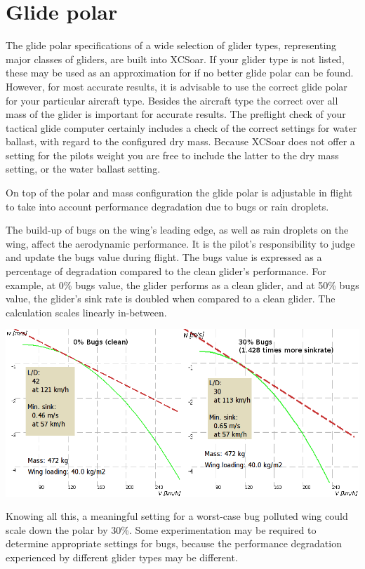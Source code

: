 \section{Glide polar}

The glide polar specifications of a wide selection of glider types,
representing major classes of gliders, are built into XCSoar.
If your glider type is not listed, these may be used as an approximation for  
if no better glide polar can be found.   However, for most 
accurate results, it is advisable to use the correct glide polar for your particular
aircraft type. 
Besides the aircraft type the correct over all mass of the glider is important for 
accurate results. 
The preflight check of your tactical glide computer certainly 
includes a check of the correct settings for water ballast, with regard to the 
configured dry mass. Because XCSoar does not offer a setting for the pilots 
weight you are free to include the latter to the dry mass setting, or the 
water ballast setting.

On top of the polar and mass configuration the glide polar is adjustable 
in flight to take into account performance degradation due to bugs or 
rain droplets.

The build-up of bugs on the wing's leading edge, as well as rain
droplets on the wing, affect the aerodynamic performance.  It is the
pilot's responsibility to judge and update the bugs value during
flight.  The bugs value is expressed as a percentage of degradation 
compared to the clean glider's performance.  
For example, at 0\% bugs value, the glider
performs as a clean glider, and at 50\% bugs value, the glider's
sink rate is doubled when compared to a clean glider. The calculation 
scales linearly in-between. 

\begin{center}
\includegraphics[angle=0,width=\linewidth,keepaspectratio='true']{figures/cut-clean-dirty-polar.png}
\end{center}
Knowing all this, a meaningful setting for a worst-case bug polluted wing could
scale down the polar by 30\%. Some experimentation may be required to determine 
appropriate settings for bugs, because the performance degradation experienced 
by different glider types may be different.


